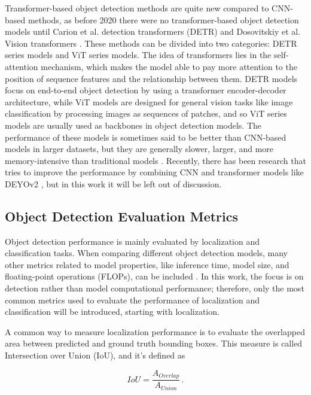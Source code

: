 Transformer-based object detection methods are quite new compared to CNN-based methods, as before 2020 there were no transformer-based object detection models until Carion et al. detection transformers (DETR) \cite{carion} and Dosovitskiy et al. Vision transformers \cite{dosovitskiy}. These methods can be divided into two categories: DETR series models and ViT series models. The idea of transformers lies in the self-attention mechanism, which makes the model able to pay more attention to the position of sequence features and the relationship between them. DETR models focus on end-to-end object detection by using a transformer encoder-decoder architecture, while ViT models are designed for general vision tasks like image classification by processing images as sequences of patches, and so ViT series models are usually used as backbones in object detection models. \cite{SUN2024108458} The performance of these models is sometimes said to be better than CNN-based models in larger datasets, but they are generally slower, larger, and more memory-intensive than traditional models \cite{Mukhopadhyay2024, battery, inproceedings}. Recently, there has been research that tries to improve the performance by combining CNN and transformer models like DEYOv2 \cite{DEYOv2}, but in this work it will be left out of discussion.


\subsection{Object Detection Evaluation Metrics}
\label{sec:object_detection_evaluation_metrics}
Object detection performance is mainly evaluated by localization and classification tasks. When comparing different object detection models, many other metrics related to model properties, like inference time, model size, and floating-point operations (FLOPs), can be included \cite{modelcomparison}. In this work, the focus is on detection rather than model computational performance; therefore, only the most common metrics used to evaluate the performance of localization and classification will be introduced, starting with localization.

A common way to measure localization performance is to evaluate the overlapped area between predicted and ground truth bounding boxes. This measure is called Intersection over Union (IoU), and it's defined as

\begin{equation}
    IoU = \frac{A_{Overlap}}{A_{Union}} \,.
\end{equation}

